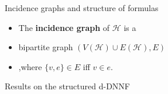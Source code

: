 \begin{frame}[t]{Incidence graphs and structure of formulas}
	\begin{itemize}
		\item The \textbf{incidence graph} of $\mathcal{H}$ is a 
		\item[] \hspace{1cm}bipartite graph $(V(\mathcal{H}) \cup E(\mathcal{H}), E)$
		\item[] \hspace{1cm},where $\{v, e\} \in E$ iff $v \in e$.
			\vspace{.5cm}


			\vspace{.5cm}
	\end{itemize}

\end{frame}
\begin{frame}{Results on the structured d-DNNF}
\end{frame}
